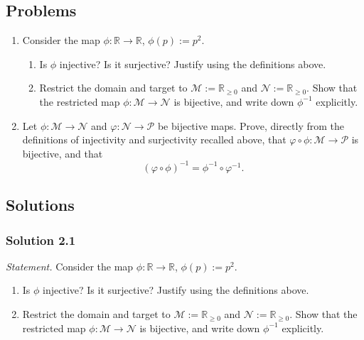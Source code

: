 \documentclass[11pt]{article}
\begin{document}
\subsection*{Problems}

\begin{enumerate}[label=\textbf{2.\arabic*}, leftmargin=2.2cm]

\item \label{prob:maps}
Consider the map $\phi : \mathbb{R} \longrightarrow \mathbb{R}$, $\phi(p) := p^2$.
\begin{enumerate}[label=(\alph*)]
  \item Is $\phi$ injective? Is it surjective? Justify using the definitions above.
  \item Restrict the domain and target to $\mathcal{M} := \mathbb{R}_{\geq 0}$ and $\mathcal{N} := \mathbb{R}_{\geq 0}$. Show that the restricted map $\phi : \mathcal{M} \to \mathcal{N}$ is bijective, and write down $\phi^{-1}$ explicitly.
\end{enumerate}

\item \label{prob:composition}
Let $\phi : \mathcal{M} \to \mathcal{N}$ and $\varphi : \mathcal{N} \to \mathcal{P}$ be bijective maps. Prove, directly from the definitions of injectivity and surjectivity recalled above, that $\varphi \circ \phi : \mathcal{M} \to \mathcal{P}$ is bijective, and that
\[
(\varphi \circ \phi)^{-1} = \phi^{-1} \circ \varphi^{-1}.
\]

\end{enumerate}

\subsection*{Solutions}

\subsubsection*{Solution 2.1}

\noindent\textit{Statement.} Consider the map $\phi : \mathbb{R} \longrightarrow \mathbb{R}$, $\phi(p) := p^2$.
\begin{enumerate}[label=(\alph*)]
  \item Is $\phi$ injective? Is it surjective? Justify using the definitions above.
  \item Restrict the domain and target to $\mathcal{M} := \mathbb{R}_{\geq 0}$ and $\mathcal{N} := \mathbb{R}_{\geq 0}$. Show that the restricted map $\phi : \mathcal{M} \to \mathcal{N}$ is bijective, and write down $\phi^{-1}$ explicitly.
\end{enumerate}
\end{document}

